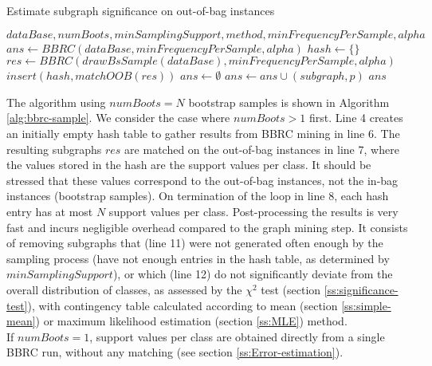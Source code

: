 \documentclass{article}
\begin{document}
\renewcommand{\algorithmicrequire}{\textbf{Input:}}
\renewcommand{\algorithmicensure}{\textbf{Output:}}
\begin{algorithm}[t]
  \caption{Estimate subgraph significance on out-of-bag instances}
  \label{alg:bbrc-sample}
  {\small \begin{algorithmic}[1]
  \Require $dataBase, numBoots, minSamplingSupport, method, minFrequencyPerSample, alpha$
    \State $ans \gets BBRC(dataBase, minFrequencyPerSample, alpha)$
  \Else
    \State $hash \gets \{\}$
     
        \State $res \gets BBRC(drawBsSample(dataBase), minFrequencyPerSample, alpha)$
      \State $insert(hash,matchOOB(res))$
    \EndFor
    \State $ans \gets \emptyset$
          \State $ans\gets ans \cup (subgraph,p)$
        \EndIf
      \EndIf
    \EndFor
  \EndIf
  \Ensure $ans$
\end{algorithmic}}
\end{algorithm}
The algorithm using $numBoots=N$ bootstrap samples is shown in Algorithm
\ref{alg:bbrc-sample}.  We consider the case where $numBoots>1$ first.  Line 4
creates an initially empty hash table to gather results from BBRC mining in
line 6. The resulting subgraphs $res$ are matched on the out-of-bag instances
in line 7, where the values stored in the hash are the support values per
class. It should be stressed that these values correspond to the out-of-bag
instances, not the in-bag instances (bootstrap samples). On termination of the
loop in line 8, each hash entry has at most $N$ support values per class.
Post-processing the results is very fast and incurs negligible overhead
compared to the graph mining step. It consists of removing subgraphs that (line
11) were not generated often enough by the sampling process (have not enough
entries in the hash table, as determined by $minSamplingSupport$), or which
(line 12) do not significantly deviate from the overall distribution of
classes, as assessed by the $\chi^2$ test (section \ref{ss:significance-test}),
with contingency table calculated according to mean (section
\ref{ss:simple-mean}) or maximum likelihood estimation (section \ref{ss:MLE})
method.\\ If $numBoots=1$, support values per class are obtained directly from
a single BBRC run, without any matching (see section \ref{ss:Error-estimation}).
\end{document}

